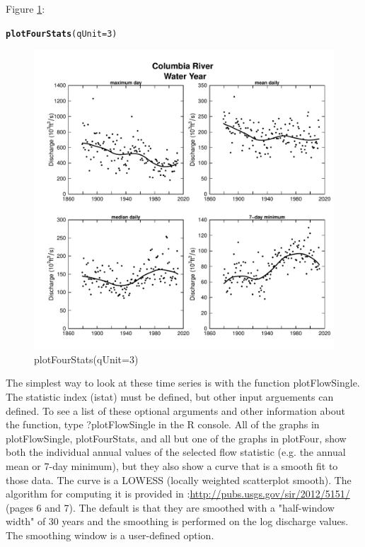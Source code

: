 \documentclass[a4paper,11pt]{article}\usepackage{graphicx, color}
\makeatletter
\newcommand{\hlfunctioncall}[1]{\textcolor[rgb]{0.501960784313725,0,0.329411764705882}{\textbf{#1}}}%
\newenvironment{kframe}{%
 \def\at@end@of@kframe{}%
 \ifinner\ifhmode%
  \def\at@end@of@kframe{\end{minipage}}%
  \begin{minipage}{\columnwidth}%
 \fi\fi%
 \def\FrameCommand##1{\hskip\@totalleftmargin \hskip-\fboxsep
 \colorbox{shadecolor}{##1}\hskip-\fboxsep
     \hskip-\linewidth \hskip-\@totalleftmargin \hskip\columnwidth}%
 \MakeFramed {\advance\hsize-\width
   \@totalleftmargin\z@ \linewidth\hsize
   \@setminipage}}%
 {\par\unskip\endMakeFramed%
 \at@end@of@kframe}
\newenvironment{knitrout}{}{} %
\makeatother
\begin{document}
Figure \ref{fig:plotFourStats}:
\begin{knitrout}
\color{fgcolor}\begin{kframe}
\begin{alltt}
\hlfunctioncall{plotFourStats}(qUnit=3)
\end{alltt}
\end{kframe}\begin{figure}[]

\includegraphics[width=1\linewidth,height=1\linewidth]{figure/plotFourStats} \caption[plotFourStats(qUnit=3)]{plotFourStats(qUnit=3)\label{fig:plotFourStats}}
\end{figure}


\end{knitrout}



\FloatBarrier

The simplest way to look at these time series is with the function plotFlowSingle. The statistic index (istat) must be defined, but other input arguements can defined. To see a list of these optional arguments and other information about the function, type ?plotFlowSingle in the R console. All of the graphs in plotFlowSingle, plotFourStats, and all but one of the graphs in plotFour, show both the individual annual values of the selected flow statistic (e.g. the annual mean or 7-day minimum), but they also show a curve that is a smooth fit to those data.  The curve is a LOWESS (locally weighted scatterplot smooth).  The algorithm for computing it is provided in \cite{HirschV}:\url{http://pubs.usgs.gov/sir/2012/5151/}  (pages 6 and 7).  The default is that they are smoothed with a "half-window width" of 30 years and the smoothing is performed on the log discharge values.  The smoothing window is a user-defined option. 
\end{document}
